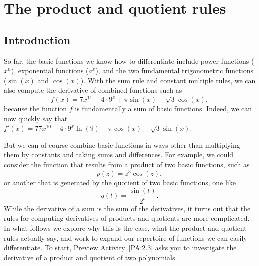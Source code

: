 \section{The product and quotient rules} \label{S:2.3.ProdQuot}

\vspace*{-14 pt}

\subsection*{Introduction}

So far, the basic functions we know how to differentiate include power functions ($x^n$), exponential functions ($a^x$), and the two fundamental trigonometric functions ($\sin(x)$ and $\cos(x)$).  With the sum rule and constant multiple rules, we can also compute the derivative of combined functions such as
$$f(x) = 7x^{11} - 4 \cdot 9^x + \pi \sin(x) - \sqrt{3}\cos(x),$$
because the function $f$ is fundamentally a sum of basic functions.  Indeed, we can now quickly say that $f'(x) = 77x^{10} - 4 \cdot 9^x \ln(9) + \pi \cos(x) + \sqrt{3} \sin(x)$.  

But we can of course combine basic functions in ways other than multiplying them by constants and taking sums and differences.  For example, we could consider the function that results from a product of two basic functions, such as $$p(z) = z^3 \cos(z),$$
or another that is generated by the quotient of two basic functions, one like
$$q(t) = \frac{\sin(t)}{2^t}.$$
While the derivative of a sum is the sum of the derivatives, it turns out that the rules for computing derivatives of products and quotients are more complicated.  In what follows we explore why this is the case, what the product and quotient rules actually say, and work to expand our repertoire of functions we can easily differentiate.  To start, Preview Activity~\ref{PA:2.3} asks you to investigate the derivative of a product and quotient of two polynomials.

